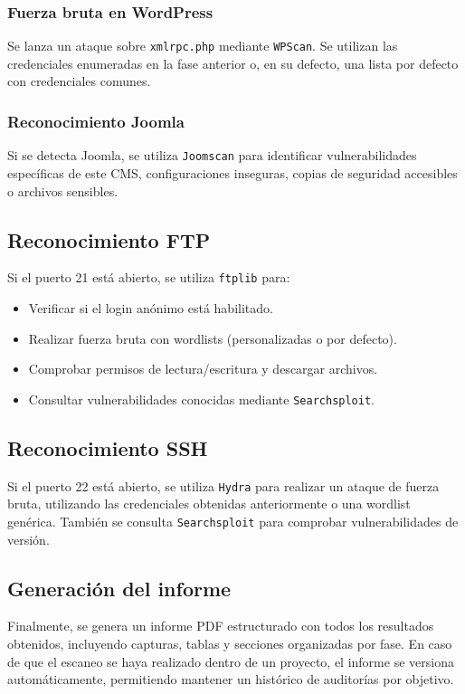 \begin{parskipenv}
\subsubsection*{Fuerza bruta en WordPress}
Se lanza un ataque sobre \texttt{xmlrpc.php} mediante \texttt{WPScan}. Se utilizan las credenciales enumeradas en la fase anterior o, en su defecto, una lista por defecto con credenciales comunes.

\subsubsection*{Reconocimiento Joomla}
Si se detecta Joomla, se utiliza \texttt{Joomscan} para identificar vulnerabilidades específicas de este CMS, configuraciones inseguras, copias de seguridad accesibles o archivos sensibles.

\subsection{Reconocimiento FTP}
Si el puerto 21 está abierto, se utiliza \texttt{ftplib} para:
\begin{itemize}
  \item Verificar si el login anónimo está habilitado.
  \item Realizar fuerza bruta con wordlists (personalizadas o por defecto).
  \item Comprobar permisos de lectura/escritura y descargar archivos.
  \item Consultar vulnerabilidades conocidas mediante \texttt{Searchsploit}.
\end{itemize}

\subsection{Reconocimiento SSH}
Si el puerto 22 está abierto, se utiliza \texttt{Hydra} para realizar un ataque de fuerza bruta, utilizando las credenciales obtenidas anteriormente o una wordlist genérica. También se consulta \texttt{Searchsploit} para comprobar vulnerabilidades de versión.

\subsection{Generación del informe}
Finalmente, se genera un informe PDF estructurado con todos los resultados obtenidos, incluyendo capturas, tablas y secciones organizadas por fase. En caso de que el escaneo se haya realizado dentro de un proyecto, el informe se versiona automáticamente, permitiendo mantener un histórico de auditorías por objetivo.


\end{parskipenv}
